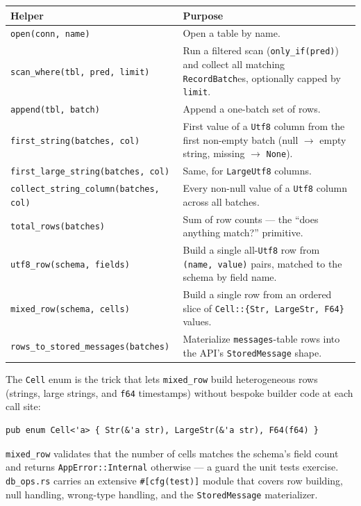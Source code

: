 \begin{center}
\begin{longtable}{@{}p{}p{}@{}}
\toprule
\textbf{Helper} & \textbf{Purpose} \\
\midrule
\endhead
\verb|open(conn, name)| & Open a table by name. \\
\verb|scan_where(tbl, pred, limit)| & Run a filtered scan (\verb|only_if(pred)|) and collect all matching \verb|RecordBatch|es, optionally capped by \verb|limit|. \\
\verb|append(tbl, batch)| & Append a one-batch set of rows. \\
\verb|first_string(batches, col)| & First value of a \verb|Utf8| column from the first non-empty batch (null $\to$ empty string, missing $\to$ \verb|None|). \\
\verb|first_large_string(batches, col)| & Same, for \verb|LargeUtf8| columns. \\
\verb|collect_string_column(batches, col)| & Every non-null value of a \verb|Utf8| column across all batches. \\
\verb|total_rows(batches)| & Sum of row counts --- the ``does anything match?'' primitive. \\
\verb|utf8_row(schema, fields)| & Build a single all-\verb|Utf8| row from \verb|(name, value)| pairs, matched to the schema by field name. \\
\verb|mixed_row(schema, cells)| & Build a single row from an ordered slice of \verb|Cell::{Str, LargeStr, F64}| values. \\
\verb|rows_to_stored_messages(batches)| & Materialize \verb|messages|-table rows into the API's \verb|StoredMessage| shape. \\
\bottomrule
\end{longtable}
\end{center}

The \verb|Cell| enum is the trick that lets \verb|mixed_row| build heterogeneous
rows (strings, large strings, and \verb|f64| timestamps) without bespoke builder
code at each call site:

\begin{lstlisting}
pub enum Cell<'a> { Str(&'a str), LargeStr(&'a str), F64(f64) }
\end{lstlisting}

\verb|mixed_row| validates that the number of cells matches the schema's field
count and returns \verb|AppError::Internal| otherwise --- a guard the unit tests
exercise. \verb|db_ops.rs| carries an extensive \verb|#[cfg(test)]| module that
covers row building, null handling, wrong-type handling, and the
\verb|StoredMessage| materializer.

